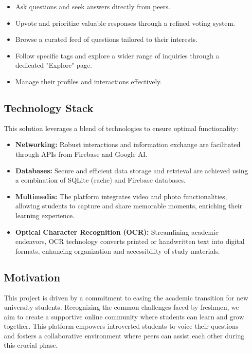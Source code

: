\begin{itemize}
  \item Ask questions and seek answers directly from peers.
  \item Upvote and prioritize valuable responses through a refined voting system.
  \item Browse a curated feed of questions tailored to their interests.
  \item Follow specific tags and explore a wider range of inquiries through a dedicated "Explore" page.
  \item Manage their profiles and interactions effectively.
\end{itemize}

\subsection{Technology Stack}

This solution leverages a blend of technologies to ensure optimal functionality:

\begin{itemize}
  \item \textbf{Networking:} Robust interactions and information exchange are facilitated through APIs from Firebase and Google AI.
  \item \textbf{Databases:} Secure and efficient data storage and retrieval are achieved using a combination of SQLite (cache) and Firebase databases.
  \item \textbf{Multimedia:} The platform integrates video and photo functionalities, allowing students to capture and share memorable moments, enriching their learning experience.
  \item \textbf{Optical Character Recognition (OCR):} Streamlining academic endeavors, OCR technology converts printed or handwritten text into digital formats, enhancing organization and accessibility of study materials.
\end{itemize}

\subsection{Motivation}

This project is driven by a commitment to easing the academic transition for new university students. Recognizing the common challenges faced by freshmen, we aim to create a supportive online community where students can learn and grow together. This platform empowers introverted students to voice their questions and fosters a collaborative environment where peers can assist each other during this crucial phase.





